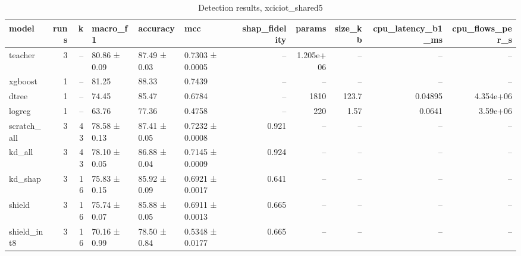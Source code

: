 \begin{table}
\caption{Detection results, xciciot_shared5}
\begin{tabular}{lrrlllrrrrr}
\toprule
model & runs & k & macro_f1 & accuracy & mcc & shap_fidelity & params & size_kb & cpu_latency_b1_ms & cpu_flows_per_s \\
\midrule
teacher & 3 & -- & 80.86 ± 0.09 & 87.49 ± 0.03 & 0.7303 ± 0.0005 & -- & 1.205e+06 & -- & -- & -- \\
xgboost & 1 & -- & 81.25 & 88.33 & 0.7439 & -- & -- & -- & -- & -- \\
dtree & 1 & -- & 74.45 & 85.47 & 0.6784 & -- & 1810 & 123.7 & 0.04895 & 4.354e+06 \\
logreg & 1 & -- & 63.76 & 77.36 & 0.4758 & -- & 220 & 1.57 & 0.0641 & 3.59e+06 \\
scratch_all & 3 & 43 & 78.58 ± 0.13 & 87.41 ± 0.05 & 0.7232 ± 0.0008 & 0.921 & -- & -- & -- & -- \\
kd_all & 3 & 43 & 78.10 ± 0.05 & 86.88 ± 0.04 & 0.7145 ± 0.0009 & 0.924 & -- & -- & -- & -- \\
kd_shap & 3 & 16 & 75.83 ± 0.15 & 85.92 ± 0.09 & 0.6921 ± 0.0017 & 0.641 & -- & -- & -- & -- \\
shield & 3 & 16 & 75.74 ± 0.07 & 85.88 ± 0.05 & 0.6911 ± 0.0013 & 0.665 & -- & -- & -- & -- \\
shield_int8 & 3 & 16 & 70.16 ± 0.99 & 78.50 ± 0.84 & 0.5348 ± 0.0177 & 0.665 & -- & -- & -- & -- \\
\bottomrule
\end{tabular}
\end{table}
